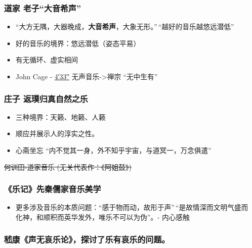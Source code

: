 \documentclass[
]{article}
\providecommand{\tightlist}{%
  \setlength{\itemsep}{0pt}\setlength{\parskip}{0pt}}
\begin{document}
\subsubsection{道家
老子``大音希声''}\label{ux9053ux5bb6-ux8001ux5b50ux5927ux97f3ux5e0cux58f0}

\begin{itemize}
\tightlist
\item
  ``大方无隅，大器晚成，\textbf{大音希声}，大象无形。''\,``越好的音乐越悠远潜低''
\item
  好的音乐的境界：悠远潜低（姿态平易）
\item
  有无循环、虚实相间
\item
  John Cage -
  \href{https://www.artnews.com/art-news/news/john-cage-4-33-explained-1234704644/}{4′33″}
  无声音乐-\textgreater 禅宗 ``无中生有''
\end{itemize}

\subsubsection{庄子
返璞归真自然之乐}\label{ux5e84ux5b50-ux8fd4ux749eux5f52ux771fux81eaux7136ux4e4bux4e50}

\begin{itemize}
\tightlist
\item
  三种境界：天籁、地籁、人籁
\item
  顺应并展示人的淳实之性。
\item
  心斋坐忘 ``内不觉其一身，外不知乎宇宙，与道冥一，万念俱遣''
\end{itemize}

\sout{何训田-道家音乐 (无关代表作：《阿姐鼓》) }

\subsubsection{《乐记》先秦儒家音乐美学}\label{ux4e50ux8bb0ux5148ux79e6ux5112ux5bb6ux97f3ux4e50ux7f8eux5b66}

\begin{itemize}
\tightlist
\item
  更多涉及音乐的本质问题：``感于物而动，故形于声''\,``是故情深而文明气盛而化神，和顺积而英华发外，唯乐不可以为伪''。-
  内心感触
\end{itemize}

\subsubsection{嵇康《声无哀乐论》，探讨了乐有哀乐的问题。}\label{ux5d47ux5eb7ux58f0ux65e0ux54c0ux4e50ux8bbaux63a2ux8ba8ux4e86ux4e50ux6709ux54c0ux4e50ux7684ux95eeux9898}
\end{document}
